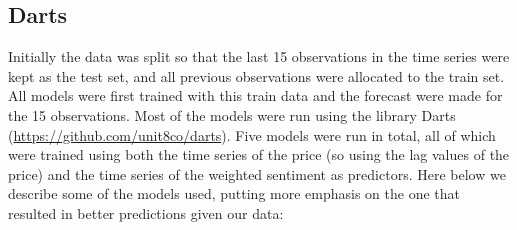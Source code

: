 \documentclass{article}
\begin{document}
\subsection{Darts}
Initially the data was split so that the last 15 observations in the time series were kept as the test set, and all previous observations were allocated to the train set. All models were first trained with this train data and the forecast were made for the 15 observations. 
Most of the models were run using the library Darts (\url{https://github.com/unit8co/darts}). Five models were run in total, all of which were trained using both the time series of the price (so using the lag values of the price) and the time series of the weighted sentiment as predictors. Here below we describe some of the models used, putting more emphasis on the one that resulted in better predictions given our data: 
\end{document}
